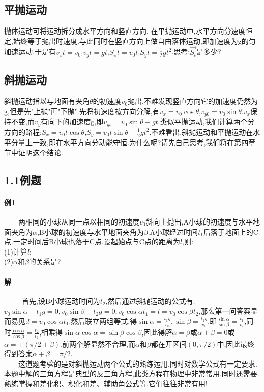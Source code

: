  \subsection{平抛运动}
 抛体运动可将运动拆分成水平方向和竖直方向.
 在平抛运动中,水平方向分速度恒定,始终等于抛出时速度.与此同时在竖直方向上做自由落体运动,即加速度为g的匀加速运动.于是有$v_xt=v_0$,$v_yt=gt$,$S_xt=v_0t$,$S_yt=\frac{1}{2}gt^2$.思考:$\vec{S_t}$是多少?
 \subsection{斜抛运动}
 斜抛运动指以与地面有夹角$\theta$的初速度$v_0$抛出.不难发现竖直方向它的加速度仍然为g,但是先"上抛"再"下抛".先将初速度按方向分解,有$v_x=v_0\cos\theta$,$v_{y0}=v_0\sin\theta$.$v_x$保持不变,而$v_y$有向下的加速度g,即$v_{yt}=v_0\sin\theta-gt$.类似平抛运动,我们计算两个分方向的路程:$S_x=v_0t\cos\theta$,$S_y=v_0t\sin\theta-\frac{1}{2}gt^2$.不难看出,斜抛运动和平抛运动在水平分量上一致,即在水平方向分动能守恒.为什么呢?请先自己思考,我们将在第四章节中证明这个结论.
 \subsection{1.1例题}
 \paragraph{例1} 
 \ \ \ \ 两相同的小球从同一点以相同的初速度$v_0$斜向上抛出,A小球的初速度与水平地面夹角为$\alpha$,B小球的初速度与水平地面夹角为$\beta$.A小球经过时间$t_1$后落于地面上的C点.一定时间后B小球也落于C点.设起始点与C点的距离为$l$,则:\\(1)计算$l$;\\(2)$\alpha$和$\beta$的关系是?
 \paragraph{解}
 \ \ \ \ \  首先,设B小球运动时间为$t_2$,然后通过斜抛运动的公式有:$v_0\sin\alpha-t_1g=0,v_0\sin\beta-t_2g=0,v_0\cos\alpha t_1=l=v_0\cos\beta t_2$,那么第一问答案显而易见:$l=v_0\cos\alpha t_1$.然后联立两组等式,得$\sin\alpha=\frac{t_1g}{v_0},\sin\beta=\frac{t_2g}{v_0}$,即$\frac{\sin\alpha}{\sin\beta}=\frac{t_1}{t_2}$,同时$\frac{\cos\alpha}{\cos\beta}=\frac{t_2}{t_1}$,相乘得$\sin\alpha\cos\alpha=\sin\beta\cos\beta$,因此得解$\alpha=\beta$或$\alpha+\beta=0$或$\alpha=\pm(\pi/2\pm \beta)$.前两个解显然不合理,而$\alpha$和$\beta$都在开区间$(0,\pi/2)$中,因此最终得到答案$\alpha+\beta=\pi/2$.\\\ \ \ \ 这道题考验的是对斜抛运动两个公式的熟练运用,同时对数学公式有一定要求.本题中解的三角方程是典型的反三角方程,此类方程在物理中非常常用.同时还需要熟练掌握和差化积、积化和差、辅助角公式等.它们往往非常有用!
